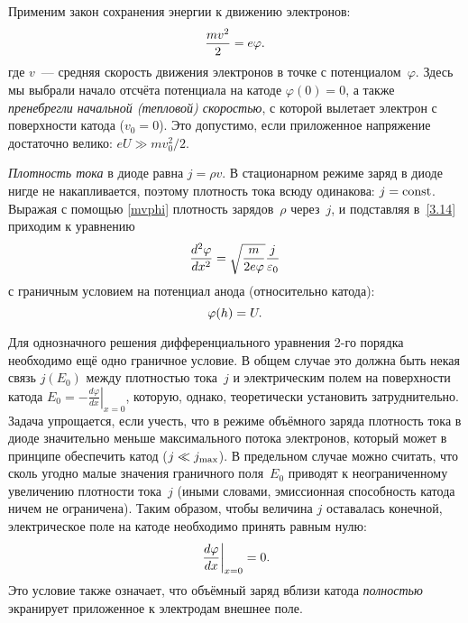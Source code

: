 Применим закон сохранения энергии к движению электронов:
\begin{equation}
\eqmark{mvphi}
    \frac{mv^2}{2}=e\varphi.
\end{equation}
где $v$~--- средняя скорость движения электронов в точке с потенциалом~$\varphi$.
Здесь мы выбрали начало отсчёта потенциала на катоде $\varphi(0)=0$, а также
\emph{пренебрегли начальной (тепловой) скоростью},
с которой вылетает электрон с поверхности катода ($v_0=0$). 
Это допустимо, если приложенное напряжение достаточно велико: $eU\gg mv_0^2/2$.

\emph{Плотность тока} в диоде равна $j=\rho v$. В стационарном режиме заряд в диоде нигде не накапливается,
поэтому плотность тока всюду одинакова: $j=\mathrm{const}$.
Выражая с помощью \eqref{mvphi} плотность зарядов~$\rho$ через~$j$, 
и подставляя в~\eqref{3.14} приходим к уравнению
\begin{equation}
    \eqmark{3.15}
    \frac{d^2\varphi}{dx^2}=\sqrt{\frac{m}{2e\varphi}} \frac{j}{\varepsilon_0}
\end{equation}
с граничным условием на потенциал анода (относительно катода):
\begin{equation}
\eqmark{bound1}
 \varphi(h) = U.
\end{equation}

Для однозначного решения дифференциального уравнения 2-го порядка 
необходимо ещё одно граничное условие. В общем случае это должна 
быть некая связь $j(E_0)$ между плотностью тока~$j$ и электрическим 
полем на поверхности катода 
$E_0 = -\left.\frac{d\varphi}{dx}\right|_{x=0}$,
которую, однако, теоретически установить затруднительно.
Задача упрощается, если учесть, что в режиме объёмного заряда 
плотность тока в диоде значительно меньше
максимального потока электронов, 
который может в принципе обеспечить катод ($j\ll j_{\rm max}$). 
В предельном случае можно считать, что сколь угодно малые значения 
граничного поля~$E_0$ приводят 
к неограниченному увеличению плотности тока~$j$
(иными словами, эмиссионная способность катода ничем не ограничена). 
Таким образом, чтобы величина $j$ оставалась конечной, электрическое поле 
на катоде необходимо принять равным нулю:
\begin{equation}
\eqmark{bound2}
    \left.\frac{d\varphi}{dx}\right|_{x = 0}=0.
\end{equation}
Это условие также означает, что объёмный заряд вблизи катода 
\emph{полностью} экранирует приложенное к электродам внешнее поле.


